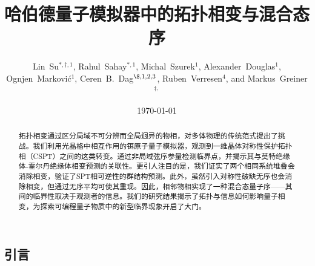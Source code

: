 \documentclass[preprint,superscriptaddress,floatfix, nofootinbib]{revtex4-2}
\begin{document}
\begin{CJK*}{UTF8}{gbsn}

\title{哈伯德量子模拟器中的拓扑相变与混合态序}
\author{
Lin~Su$^{*,\dagger,1}$,
Rahul~Sahay$^{*,1}$,
Michal~Szurek$^{1}$,
Alexander~Douglas$^{1}$,
Ognjen~Markovi\'{c}$^{1}$,
Ceren~B.~Dag$^{\S, 1,2,3}$,
Ruben~Verresen$^{4}$,
and Markus~Greiner$^{\ddagger,}$
}


\date{\today}
\begin{abstract}
拓扑相变通过区分局域不可分辨而全局迥异的物相，对多体物理的传统范式提出了挑战。我们利用光晶格中相互作用的铒原子量子模拟器，观测到一维晶体对称性保护拓扑相（CSPT）之间的这类转变。通过非局域弦序参量检测临界点，并揭示其与莫特绝缘体-霍尔丹绝缘体相变预测的关联性。更引人注目的是，我们证实了两个相同系统堆叠会消除相变，验证了SPT相可逆性的群结构预测。此外，虽然引入对称性破缺无序也会消除相变，但通过无序平均可使其重现。因此，相邻物相实现了一种混合态量子序——其间的临界性取决于观测者的信息。我们的研究结果揭示了拓扑与信息如何影响量子相变，为探索可编程量子物质中的新型临界现象开启了大门。
\end{abstract}

\maketitle
\section{引言}


\end{CJK*}
\end{document}
